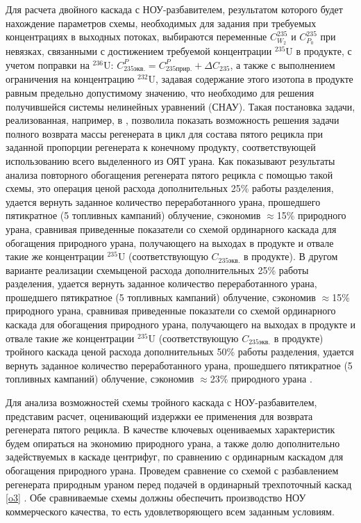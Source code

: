 Для расчета двойного каскада с НОУ-разбавителем, результатом которого будет нахождение параметров схемы, необходимых для задания при требуемых концентрациях в выходных потоках, выбираются переменные $C_{W_2}^{235}$ и $C_{P_0}^{235}$ при невязках, связанными с достижением требуемой концентрации $^{235}$U в продукте, с учетом поправки на $^{236}$U: $C_{235 экв.}^{P}=C_{235 прир.}^{P}+\Delta C_{235}$, а также с выполнением ограничения на концентрацию $^{232}$U, задавая содержание этого изотопа в продукте равным предельно допустимому значению, что необходимо для решения получившейся системы нелинейных уравнений (СНАУ). Такая постановка задачи, реализованная, например, в \cite{gusevMultycascadeEnrichmentSchemes2020}, позволила показать возможность решения задачи полного возврата массы регенерата в цикл для состава пятого рецикла при заданной пропорции регенерата к конечному продукту, соответствующей использованию всего выделенного из ОЯТ урана. Как показывают результаты анализа повторного обогащения регенерата пятого рецикла с помощью такой схемы, это операция ценой расхода дополнительных 25\% работы разделения, удается вернуть заданное количество переработанного урана, прошедшего пятикратное (5 топливных кампаний) облучение, сэкономив $\approx$15\% природного урана, сравнивая приведенные показатели со схемой ординарного каскада для обогащения природного урана, получающего на выходах в продукте и отвале такие же концентрации $^{235}$U (соответствующую $C_{235 экв.}$ в продукте). В другом варианте реализации схемыценой расхода дополнительных 25\% работы разделения, удается вернуть заданное количество переработанного урана, прошедшего пятикратное (5 топливных кампаний) облучение, сэкономив $\approx$15\% природного урана, сравнивая приведенные показатели со схемой ординарного каскада для обогащения природного урана, получающего на выходах в продукте и отвале такие же концентрации $^{235}$U (соответствующую $C_{235 экв.}$ в продукте) тройного каскада ценой расхода дополнительных 50\% работы разделения, удается вернуть заданное количество переработанного урана, прошедшего пятикратное (5 топливных кампаний) облучение, сэкономив $\approx$23\% природного урана \cite{gusevMultycascadeEnrichmentSchemes2020}.


Для анализа возможностей схемы тройного каскада с НОУ-разбавителем, представим расчет, оценивающий издержки ее применения для возврата регенерата пятого рецикла. 
В качестве ключевых оцениваемых характеристик будем опираться на экономию природного урана, а также долю дополнительно задействуемых в каскаде центрифуг, по сравнению с ординарным каскадом для обогащения природного урана. Проведем сравнение со схемой с разбавлением регенерата природным ураном перед подачей в ординарный трехпоточный каскад \ref{o3} \cite{smirnovMethodEnrichReprocessed2019}. Обе сравниваемые схемы должны обеспечить производство НОУ коммерческого качества, то есть удовлетворяющего всем заданным условиям.

